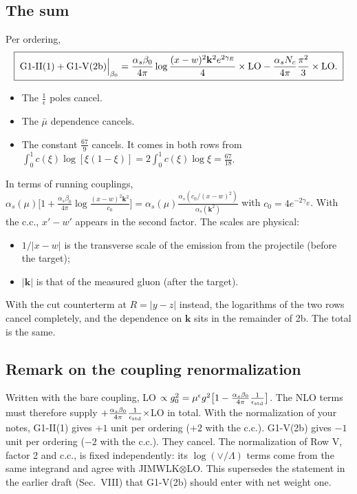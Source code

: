 \documentclass[10pt]{article}
\numberwithin{equation}{section}
\newcommand{\mub}{\bar\mu}
\newcommand{\ve}{\epsilon}
\begin{document}
\subsection{The sum}
Per ordering,
\begin{equation}
\boxed{\;\text{G1-II(1)}+\text{G1-V(2b)}\Big|_{\beta_0}=\frac{\alpha_s\beta_0}{4\pi}\log\frac{(x-w)^2\mathbf k^2e^{2\gamma_E}}{4}\times{\rm LO}-\frac{\alpha_sN_c}{4\pi}\frac{\pi^2}{3}\times{\rm LO}.\;}
\end{equation}
\begin{itemize}
\item The $\frac1\ve$ poles cancel.
\item The $\mub$ dependence cancels.
\item The constant $\frac{67}{9}$ cancels. It comes in both rows from $\int_0^1c(\xi)\log[\xi(1-\xi)]=2\int_0^1c(\xi)\log\xi=\frac{67}{18}$.
\end{itemize}
In terms of running couplings, $\alpha_s(\mu)\big[1+\frac{\alpha_s\beta_0}{4\pi}\log\frac{(x-w)^2\mathbf k^2}{c_0}\big]=\alpha_s(\mu)\frac{\alpha_s(c_0/(x-w)^2)}{\alpha_s(\mathbf k^2)}$ with $c_0=4e^{-2\gamma_E}$. With the c.c., $x'-w'$ appears in the second factor. The scales are physical:
\begin{itemize}
\item $1/|x-w|$ is the transverse scale of the emission from the projectile (before the target);
\item $|\mathbf k|$ is that of the measured gluon (after the target).
\end{itemize}
With the cut counterterm at $R=|y-z|$ instead, the logarithms of the two rows cancel completely, and the dependence on $\mathbf k$ sits in the remainder of 2b. The total is the same.

\subsection{Remark on the coupling renormalization}\label{sec:budget}
Written with the bare coupling, LO $\propto g_0^2=\mu^{\ve}g^2\big[1-\frac{\alpha_s\beta_0}{4\pi}\frac{1}{\ve_{\rm std}}\big]$. The NLO terms must therefore supply $+\frac{\alpha_s\beta_0}{4\pi}\frac{1}{\ve_{\rm std}}\times$LO in total. With the normalization of your notes, G1-II(1) gives $+1$ unit per ordering ($+2$ with the c.c.). G1-V(2b) gives $-1$ unit per ordering ($-2$ with the c.c.). They cancel. The normalization of Row V, factor 2 and c.c., is fixed independently: its $\log(\vee/\Lambda)$ terms come from the same integrand and agree with JIMWLK$\otimes$LO. This supersedes the statement in the earlier draft (Sec.~VIII) that G1-V(2b) should enter with net weight one.
\end{document}

